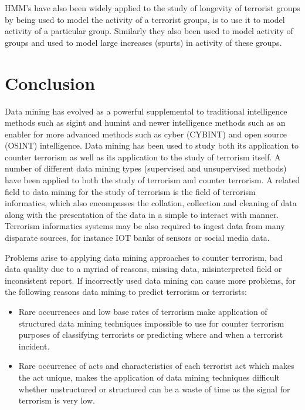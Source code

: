 HMM’s  have also been widely applied to the study of longevity of terrorist groups by being used to model the activity of a terrorist groups, is to use it to model activity of a particular group. Similarly they also been used to model activity of groups and used to model large increases (spurts) in activity of these groups. 

\section{Conclusion}

Data mining has evolved as a powerful supplemental to traditional intelligence methods such as sigint and humint and newer intelligence methods such as an enabler for more advanced methods such as cyber (CYBINT) and open source (OSINT) intelligence. Data mining has been used to study both its application to counter terrorism as well as its application to the study of terrorism itself. A number of different data mining  types (supervised and unsupervised methods) have been applied to both the study of terrorism and counter terrorism. A related field to data mining for the study of terrorism is the field of terrorism informatics, which also encompasses the collation, collection and cleaning of data along with the presentation of the data in a simple to interact with manner. Terrorism informatics systems may be also required to ingest data from many disparate sources, for instance IOT banks of sensors or social media data.

Problems arise to applying data mining approaches to counter terrorism, bad data quality due to a myriad of reasons, missing data, misinterpreted field or inconsistent report.
If incorrectly used data mining can cause more problems, for the following reasons data mining to predict terrorism or terrorists:
\begin{itemize}
\item Rare occurrences and low base rates of terrorism make application of structured data mining techniques impossible to use for counter terrorism purposes of classifying terrorists or predicting where and when a terrorist incident.
\item Rare occurrence of acts and characteristics of each terrorist act which  makes the act unique, makes the application of  data mining techniques difficult whether unstructured or structured can be a waste of time as the signal for terrorism is very low.
\end{itemize}

